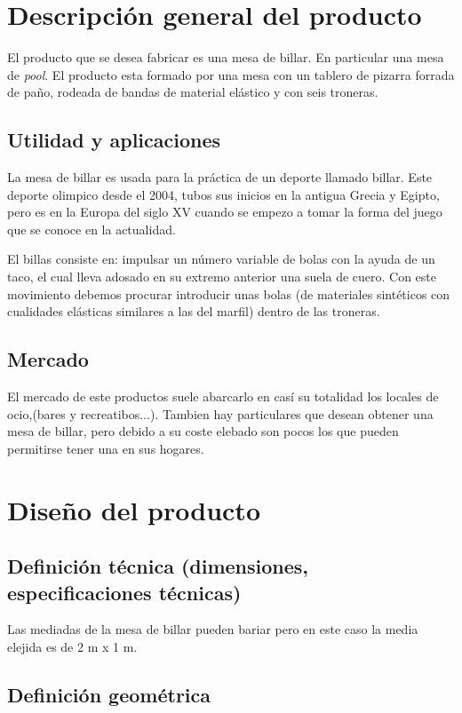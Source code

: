 \section {Descripción general del producto}
	El producto que se desea fabricar es una mesa de billar. En particular una mesa de \emph{pool}.
El producto esta formado por una  mesa con un tablero de pizarra forrada de paño, rodeada de bandas de material elástico y con seis troneras. 
	
	\subsection {Utilidad y aplicaciones}
	La mesa de billar es usada para la práctica de un deporte llamado billar. Este deporte olimpico desde el 2004, tubos sus inicios en la 
 antigua  Grecia y Egipto, pero es en la Europa del siglo XV cuando se empezo a tomar la forma del juego que se conoce en la actualidad. 

El billas consiste en: impulsar un número variable de bolas con la ayuda de un taco,  el cual lleva adosado en su extremo anterior una suela de cuero.
Con este movimiento debemos procurar introducir unas bolas (de materiales sintéticos con cualidades elásticas similares a las del marfil) dentro de las troneras.

	\subsection {Mercado}

El mercado de este productos suele abarcarlo en casí su totalidad los locales de ocio,(bares y recreatibos...). Tambien hay particulares que desean obtener una
mesa de billar, pero debido a su coste elebado son pocos los que pueden permitirse tener una en sus hogares. 
    
\section {Diseño del producto}

	\subsection {Definición técnica (dimensiones, especificaciones técnicas)}

Las mediadas de la mesa de billar pueden bariar pero en este caso la media elejida es de 2 m x 1 m.
	\subsection {Definición geométrica}

